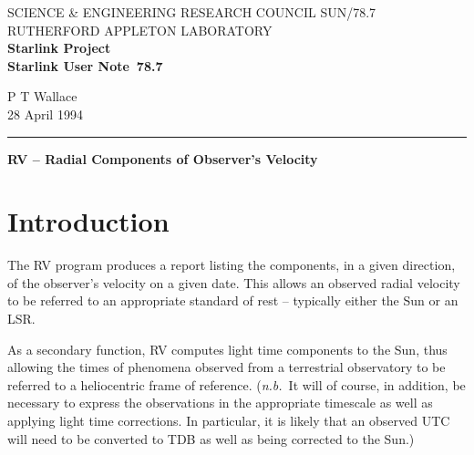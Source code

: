 \pagestyle{myheadings}

\newcommand{\stardoccategory}  {Starlink User Note}
\newcommand{\stardocinitials}  {SUN}
\newcommand{\stardocnumber}    {78.7}
\newcommand{\stardocauthors}   {P T Wallace}
\newcommand{\stardocdate}      {28 April 1994}
\newcommand{\stardoctitle}     {RV -- Radial Components of Observer's Velocity}

\newcommand{\stardocname}{\stardocinitials /\stardocnumber}
\renewcommand{\_}{{\tt\char'137}}     %
\markright{\stardocname}
\setlength{\textwidth}{160mm}
\setlength{\textheight}{230mm}
\setlength{\topmargin}{-2mm}
\setlength{\oddsidemargin}{0mm}
\setlength{\evensidemargin}{0mm}
\setlength{\parindent}{0mm}
\setlength{\parskip}{\medskipamount}
\setlength{\unitlength}{1mm}


\thispagestyle{empty}
SCIENCE \& ENGINEERING RESEARCH COUNCIL \hfill \stardocname\\
RUTHERFORD APPLETON LABORATORY\\
{\large\bf Starlink Project\\}
{\large\bf \stardoccategory\ \stardocnumber}
\begin{flushright}
\stardocauthors\\
\stardocdate
\end{flushright}
\vspace{-4mm}
\rule{\textwidth}{0.5mm}
\vspace{5mm}
\begin{center}
{\Large\bf \stardoctitle}
\end{center}
\vspace{5mm}

\section{Introduction}

The RV program produces a report listing the components, in a given direction,
of the observer's velocity on a given date.
This allows an observed radial velocity to be referred to an appropriate
standard of rest -- typically either the Sun or an LSR.

As a secondary function, RV computes light time components to the Sun, thus
allowing the times of phenomena observed from a terrestrial observatory to be
referred to a heliocentric frame of reference.
({\it n.b.}\ It
will of course, in addition, be necessary to express the observations in
the appropriate timescale as well as applying light time corrections.
In particular, it is likely that an observed UTC will need to be converted to
TDB as well as being corrected to the Sun.)

